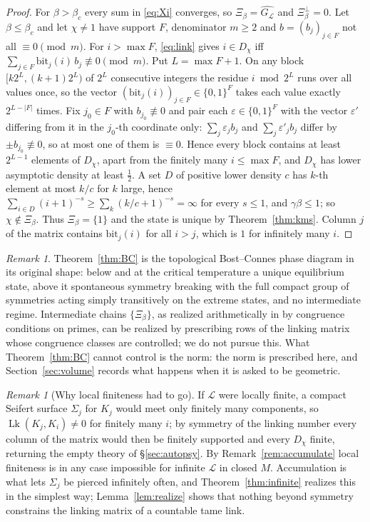 \documentclass[11pt]{amsart}
\numberwithin{equation}{section}
\theoremstyle{definition}
\theoremstyle{remark}
\newtheorem{remark}[theorem]{Remark}
\newcommand{\cL}{\mathcal{L}}
\newcommand{\Lk}{\operatorname{Lk}}
\begin{document}
\begin{proof}
For $\beta>\beta_c$ every sum in \eqref{eq:Xi} converges, so $\Xi_\beta=\widehat{G_\cL}$ and
$\Xi_\beta^\perp=0$. Let $\beta\le\beta_c$ and let $\chi\ne1$ have support $F$, denominator
$m\ge2$ and $b=(b_j)_{j\in F}$ not all $\equiv0\pmod m$. For $i>\max F$, \eqref{eq:link} gives
$i\in D_\chi$ iff $\sum_{j\in F}\mathrm{bit}_j(i)\,b_j\not\equiv0\pmod m$. Put $L=\max F+1$.
On any block $[k2^L,(k+1)2^L)$ of $2^L$ consecutive integers the residue $i\bmod 2^L$ runs
over all values once, so the vector $(\mathrm{bit}_j(i))_{j\in F}\in\{0,1\}^F$ takes each value
exactly $2^{L-|F|}$ times. Fix $j_0\in F$ with $b_{j_0}\not\equiv0$ and pair each
$\varepsilon\in\{0,1\}^F$ with the vector $\varepsilon'$ differing from it in the $j_0$-th
coordinate only: $\sum_j\varepsilon_jb_j$ and $\sum_j\varepsilon'_jb_j$ differ by
$\pm b_{j_0}\not\equiv0$, so at most one of them is $\equiv0$. Hence every block contains at
least $2^{L-1}$ elements of $D_\chi$, apart from the finitely many $i\le\max F$, and $D_\chi$
has lower asymptotic density at least $\frac12$. A set $D$ of positive lower density $c$ has
$k$-th element at most $k/c$ for $k$ large, hence
$\sum_{i\in D}(i+1)^{-s}\ge\sum_k(k/c+1)^{-s}=\infty$ for every $s\le1$, and $\gamma\beta\le1$;
so $\chi\notin\Xi_\beta$. Thus $\Xi_\beta=\{1\}$ and the state is unique by
Theorem~\ref{thm:kms}. Column $j$ of the matrix contains $\mathrm{bit}_j(i)$ for all $i>j$,
which is $1$ for infinitely many $i$.
\end{proof}

\begin{remark}
Theorem~\ref{thm:BC} is the topological Bost--Connes phase diagram in its original shape:
below and at the critical temperature a unique equilibrium state, above it spontaneous
symmetry breaking with the full compact group of symmetries acting simply transitively on the
extreme states, and no intermediate regime. Intermediate chains $\{\Xi_\beta\}$, as realized
arithmetically in \cite[Thm.~5.1]{SeriesI} by congruence conditions on primes, can be
realized by prescribing rows of the linking matrix whose congruence classes are controlled;
we do not pursue this. What Theorem~\ref{thm:BC} cannot control is the norm: the norm is
prescribed here, and Section~\ref{sec:volume} records what happens when it is asked to be
geometric.
\end{remark}

\begin{remark}[Why local finiteness had to go]\label{rem:whyaccum}
If $\cL$ were locally finite, a compact Seifert surface $\Sigma_j$ for $K_j$ would meet only
finitely many components, so $\Lk(K_j,K_i)\ne0$ for finitely many $i$; by symmetry of the
linking number every column of the matrix would then be finitely supported and every $D_\chi$
finite, returning the empty theory of \S\ref{sec:autopsy}. By Remark~\ref{rem:accumulate}
local finiteness is in any case impossible for infinite $\cL$ in closed $M$. Accumulation is
what lets $\Sigma_j$ be pierced infinitely often, and Theorem~\ref{thm:infinite} realizes
this in the simplest way; Lemma~\ref{lem:realize} shows that nothing beyond symmetry
constrains the linking matrix of a countable tame link.
\end{remark}
\end{document}

